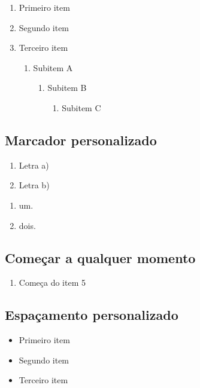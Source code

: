 \documentclass[twoside]{article}
\begin{document}
	\begin{enumerate}
	\item Primeiro item
	\item Segundo item
	\item Terceiro item
		\begin{enumerate}
			\item Subitem A
			\begin{enumerate}
				\item Subitem B
				\begin{enumerate}
					\item Subitem C
				\end{enumerate}
			\end{enumerate}
		\end{enumerate}
	\end{enumerate}

	\subsection{Marcador personalizado}
	
	\begin{enumerate}[label=\alph*)]
		\item Letra a)
		\item Letra b)
	\end{enumerate}

	\begin{enumerate}[label=\roman*.]
		\item um.
		\item dois.
	\end{enumerate}

	\subsection{Começar a qualquer momento}
	
	\begin{enumerate}[start=5]
		\item Começa do item 5
	\end{enumerate}
		
	\subsection{Espaçamento personalizado}
	
	\begin{itemize}[leftmargin=2cm, itemsep=0.5cm]
		\item Primeiro item
		\item Segundo item
		\item Terceiro item
	\end{itemize}
\end{document}
